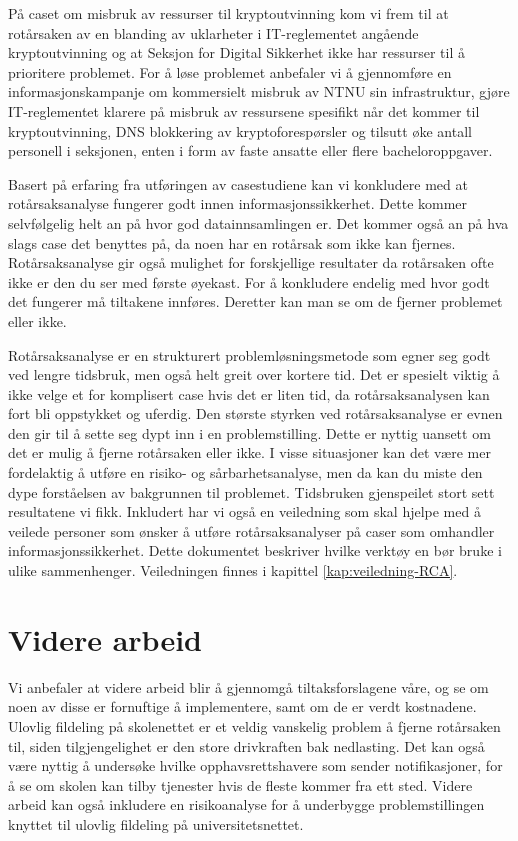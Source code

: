 \noindent På caset om misbruk av ressurser til kryptoutvinning kom vi frem til at rotårsaken av en blanding av uklarheter i IT-reglementet angående kryptoutvinning og at Seksjon for Digital Sikkerhet ikke har ressurser til å prioritere problemet. For å løse problemet anbefaler vi å gjennomføre en informasjonskampanje om kommersielt misbruk av NTNU sin infrastruktur, gjøre IT-reglementet klarere på misbruk av ressursene spesifikt når det kommer til kryptoutvinning, DNS blokkering av kryptoforespørsler og tilsutt øke antall personell i seksjonen, enten i form av faste ansatte eller flere bacheloroppgaver. 
\newline

\noindent Basert på erfaring fra utføringen av casestudiene kan vi konkludere med at rotårsaksanalyse fungerer godt innen informasjonssikkerhet. Dette kommer selvfølgelig helt an på hvor god datainnsamlingen er. Det kommer også an på hva slags case det benyttes på, da noen har en rotårsak som ikke kan fjernes. Rotårsaksanalyse gir også mulighet for forskjellige resultater da rotårsaken ofte ikke er den du ser med første øyekast. For å konkludere endelig med hvor godt det fungerer må tiltakene innføres. Deretter kan man se om de fjerner problemet eller ikke. 
\newline

\noindent Rotårsaksanalyse er en strukturert problemløsningsmetode som egner seg godt ved lengre tidsbruk, men også helt greit over kortere tid. Det er spesielt viktig å ikke velge et for komplisert case hvis det er liten tid, da rotårsaksanalysen kan fort bli oppstykket og uferdig. Den største styrken ved rotårsaksanalyse er evnen den gir til å sette seg dypt inn i en problemstilling. Dette er nyttig uansett om det er mulig å fjerne rotårsaken eller ikke. I visse situasjoner kan det være mer fordelaktig å utføre en risiko- og sårbarhetsanalyse, men da kan du miste den dype forståelsen av bakgrunnen til problemet. Tidsbruken gjenspeilet stort sett resultatene vi fikk. Inkludert har vi også en veiledning som skal hjelpe med å veilede personer som ønsker å utføre rotårsaksanalyser på caser som omhandler informasjonssikkerhet. Dette dokumentet beskriver hvilke verktøy en bør bruke i ulike sammenhenger. Veiledningen finnes i kapittel \ref{kap:veiledning-RCA}. 

\section{Videre arbeid}
Vi anbefaler at videre arbeid blir å gjennomgå tiltaksforslagene våre, og se om noen av disse er fornuftige å implementere, samt om de er verdt kostnadene. Ulovlig fildeling på skolenettet er et veldig vanskelig problem å fjerne rotårsaken til, siden tilgjengelighet er den store drivkraften bak nedlasting. Det kan også være nyttig å undersøke hvilke opphavsrettshavere som sender notifikasjoner, for å se om skolen kan tilby tjenester hvis de fleste kommer fra ett sted. Videre arbeid kan også inkludere en risikoanalyse for å underbygge problemstillingen knyttet til ulovlig fildeling på universitetsnettet. 

